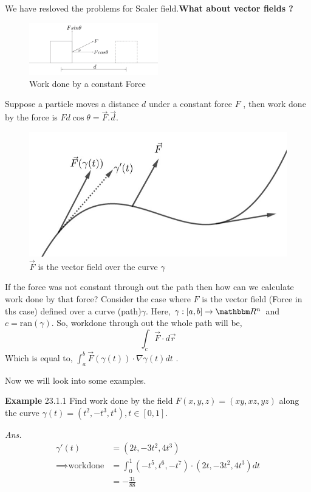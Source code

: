 \documentclass[Analysis-3]{subfiles}
\begin{document}
We have resloved the problems for Scaler field.\textbf{What about vector fields ?} 
\begin{figure}[H]
    \centering
    \includegraphics[width=0.5\textwidth]{figures/lec-23.2.png}
    \caption{Work done by a constant Force}
\end{figure}
 Suppose a particle moves a distance $d$ under a constant force $F$ , then work done by the force is $Fd\cos \theta = \vec{F}.\vec{d}$.


 \begin{figure}
    \centering
    \includegraphics[width=.98\linewidth]{figures/lec-23.3.png}
    \caption{$\vec{F}$ is the vector field over the curve $\gamma$}
\end{figure}

If the force was not constant through out the path then how can we calculate work done by that force? 
Consider the case where $F$ is the vector field (Force in ths case) defined over a curve (path)$\gamma$. Here, $\gamma : [a,b] \to \R^n$ and $c = \text{ran}(\gamma)$. So, workdone through out the whole path will be, 
\[\int_c \vec{F}\cdot d\vec{r}\] 
Which is equal to, $\int_a^b \vec{F}(\gamma(t))\cdot \nabla \gamma(t) dt$ .

Now we will look into some examples.
\vspace{0.3cm}

\textbf{Example} 23.1.1  Find work done by the field $F(x,y,z) = (xy,xz,yz)$ along the curve $\gamma(t) = (t^2,-t^3,t^4),t \in [0,1]$.

\textit{Ans.} \begin{align*}
    \gamma'(t) &= (2t,-3t^2,4t^3) \\
    \implies \text{workdone} &= \int_0^1 (-t^5,t^6,-t^7)\cdot(2t,-3t^2,4t^3) dt \\
    &= -\frac{31}{88}
\end{align*}
\end{document}
